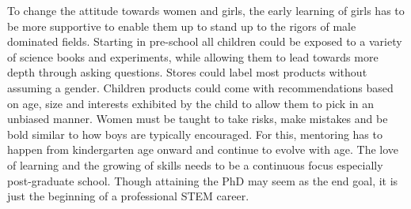 \documentclass[utf8]{frontiersSCNS} %
\begin{document}

To change the attitude towards women and girls, the early learning of girls has to be more supportive to enable them up to stand up to the rigors of male dominated fields. Starting in pre-school all children could be exposed to a variety of science books and experiments, while allowing them to lead towards more depth through asking questions.  Stores could label most products without assuming a gender. Children products could come with recommendations based on age, size and interests exhibited by the child to allow them to pick in an unbiased manner. Women must be taught to take risks, make mistakes and be bold similar to how boys are typically encouraged. For this, mentoring has to happen from kindergarten age onward and continue to evolve with age. The love of learning and the growing of skills needs to be a continuous focus especially post-graduate school. Though attaining the PhD may seem as the end goal, it is just the beginning of a professional STEM career.
\end{document}
